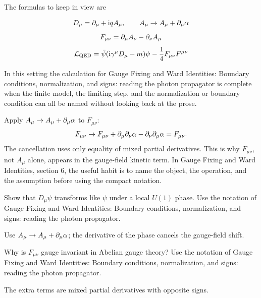 The formulas to keep in view are

\[
  D_\mu=\partial_\mu+\mathrm i qA_\mu,\qquad A_\mu\to A_\mu+\partial_\mu\alpha
\]
\[
  F_{\mu\nu}=\partial_\mu A_\nu-\partial_\nu A_\mu
\]
\[
  \mathcal L_{\mathrm{QED}}=\bar\psi(\mathrm i\gamma^\mu D_\mu-m)\psi-\frac14F_{\mu\nu}F^{\mu\nu}
\]

In this setting the calculation for Gauge Fixing and Ward Identities: Boundary conditions, normalization, and signs: reading the photon propagator is complete when the finite model, the limiting step, and the normalization or boundary condition can all be named without looking back at the prose.




\begin{example}
Apply \(A_\mu\to A_\mu+\partial_\mu\alpha\) to \(F_{\mu\nu}\):
\[
  F_{\mu\nu}\to F_{\mu\nu}+\partial_\mu\partial_\nu\alpha-\partial_\nu\partial_\mu\alpha=F_{\mu\nu}.
\]
The cancellation uses only equality of mixed partial derivatives.  This is why \(F_{\mu\nu}\), not \(A_\mu\) alone, appears in the gauge-field kinetic term.  In Gauge Fixing and Ward Identities, section 6, the useful habit is to name the object, the operation, and the assumption before using the compact notation.
\end{example}



\begin{exercise}
Show that \(D_\mu\psi\) transforms like \(\psi\) under a local \(U(1)\) phase.  Use the notation of Gauge Fixing and Ward Identities: Boundary conditions, normalization, and signs: reading the photon propagator.
\begin{answer}
Use \(A_\mu\to A_\mu+\partial_\mu\alpha\); the derivative of the phase cancels the gauge-field shift.
\end{answer}
\end{exercise}

\begin{exercise}
Why is \(F_{\mu\nu}\) gauge invariant in Abelian gauge theory?  Use the notation of Gauge Fixing and Ward Identities: Boundary conditions, normalization, and signs: reading the photon propagator.
\begin{answer}
The extra terms are mixed partial derivatives with opposite signs.
\end{answer}
\end{exercise}



